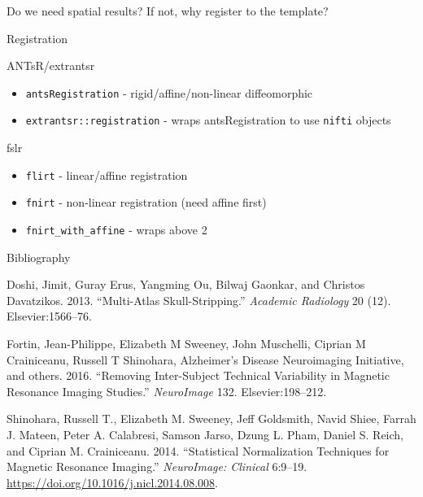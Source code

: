 \documentclass[ignorenonframetext,]{beamer}
\providecommand{\tightlist}{%
  \setlength{\itemsep}{0pt}\setlength{\parskip}{0pt}}
\begin{document}
\begin{frame}[fragile]{Do we need spatial results? If not, why register
to the template?}
\protect\hypertarget{do-we-need-spatial-results-if-not-why-register-to-the-template}{}

\begin{block}{Registration}

ANTsR/extrantsr

\begin{itemize}
\tightlist
\item
  \texttt{antsRegistration} - rigid/affine/non-linear diffeomorphic
\item
  \texttt{extrantsr::registration} - wraps antsRegistration to use
  \texttt{nifti} objects
\end{itemize}

fslr

\begin{itemize}
\tightlist
\item
  \texttt{flirt} - linear/affine registration
\item
  \texttt{fnirt} - non-linear registration (need affine first)
\item
  \texttt{fnirt\_with\_affine} - wraps above 2
\end{itemize}

\end{block}

\begin{block}{Bibliography}

\hypertarget{refs}{}
\leavevmode\hypertarget{ref-mass}{}%
Doshi, Jimit, Guray Erus, Yangming Ou, Bilwaj Gaonkar, and Christos
Davatzikos. 2013. “Multi-Atlas Skull-Stripping.” \emph{Academic
Radiology} 20 (12). Elsevier:1566–76.

\leavevmode\hypertarget{ref-ravel}{}%
Fortin, Jean-Philippe, Elizabeth M Sweeney, John Muschelli, Ciprian M
Crainiceanu, Russell T Shinohara, Alzheimer’s Disease Neuroimaging
Initiative, and others. 2016. “Removing Inter-Subject Technical
Variability in Magnetic Resonance Imaging Studies.” \emph{NeuroImage}
132. Elsevier:198–212.

\leavevmode\hypertarget{ref-shinohara_statistical_2014}{}%
Shinohara, Russell T., Elizabeth M. Sweeney, Jeff Goldsmith, Navid
Shiee, Farrah J. Mateen, Peter A. Calabresi, Samson Jarso, Dzung L.
Pham, Daniel S. Reich, and Ciprian M. Crainiceanu. 2014. “Statistical
Normalization Techniques for Magnetic Resonance Imaging.”
\emph{NeuroImage: Clinical} 6:9–19.
\url{https://doi.org/10.1016/j.nicl.2014.08.008}.


\end{block}
\end{frame}
\end{document}
